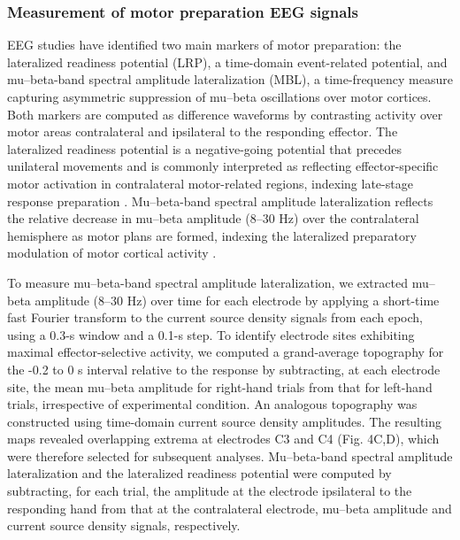 \subsubsection{Measurement of motor preparation EEG signals}

EEG studies have identified two main markers of motor preparation: the lateralized readiness potential (LRP), a time-domain event-related potential, and mu--beta-band spectral amplitude lateralization (MBL), a time-frequency measure capturing asymmetric suppression of mu--beta oscillations over motor cortices. Both markers  are computed as difference waveforms by contrasting activity over motor areas contralateral and ipsilateral to the responding effector. The lateralized readiness potential is a negative-going potential that precedes unilateral movements and is commonly interpreted as reflecting effector-specific motor activation in contralateral motor-related regions,  indexing  late-stage response preparation \parencites[e.g.][]{eimerLateralizedReadinessPotential1998}{grattonPrePoststimulusActivation1988}. Mu--beta-band spectral amplitude lateralization  reflects the relative decrease in mu--beta amplitude (8--30 Hz) over the contralateral hemisphere as motor plans are formed, indexing the lateralized preparatory modulation of motor cortical activity  \parencite{pfurtschellerEventrelatedEEGMEG1999}.     \new{-} 

To measure mu--beta-band spectral amplitude lateralization, we extracted  mu--beta amplitude  (8--30 Hz)  over time for each electrode by applying a short-time fast Fourier transform to the current source density signals from each epoch, using a 0.3-s window and a 0.1-s step.  To identify electrode sites exhibiting maximal effector-selective activity, we computed a grand-average topography for the -0.2 to 0 s interval relative to the response by subtracting, at each electrode site, the mean mu--beta amplitude for right-hand trials from that for left-hand trials, irrespective of experimental condition.  An analogous topography was  constructed using time-domain current source density  amplitudes. The resulting maps revealed overlapping extrema  at  electrodes C3 and C4 (Fig. 4C,D), which were therefore  selected for subsequent analyses. Mu--beta-band spectral amplitude lateralization and the lateralized readiness potential were computed by subtracting, for each trial, the amplitude at the electrode ipsilateral to the responding hand from that at the contralateral electrode, mu--beta amplitude and current source density signals, respectively.

